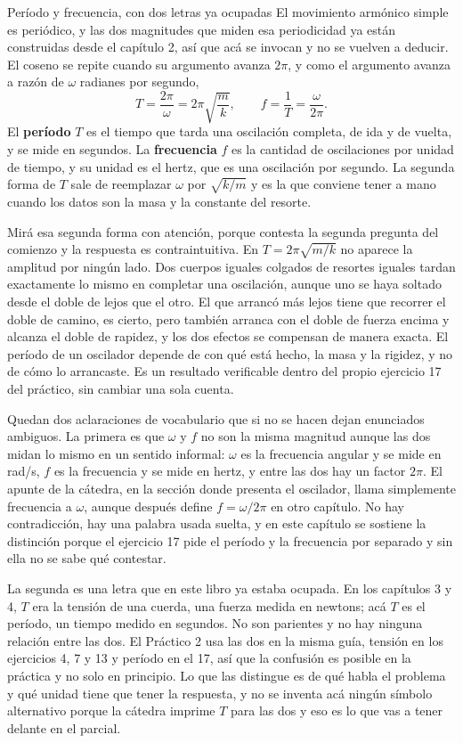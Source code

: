 \documentclass[11pt,openany]{book}
\begin{document}
\begin{bloque}{Período y frecuencia, con dos letras ya ocupadas}
El movimiento armónico simple es periódico, y las dos magnitudes que miden esa periodicidad ya están construidas desde el capítulo 2, así que acá se invocan y no se vuelven a deducir. El coseno se repite cuando su argumento avanza $2\pi$, y como el argumento avanza a razón de $\omega$ radianes por segundo,
\[
T = \frac{2\pi}{\omega} = 2\pi\sqrt{\frac{m}{k}},
\qquad
f = \frac{1}{T} = \frac{\omega}{2\pi} .
\]
El \textbf{período} $T$ es el tiempo que tarda una oscilación completa, de ida y de vuelta, y se mide en segundos. La \textbf{frecuencia} $f$ es la cantidad de oscilaciones por unidad de tiempo, y su unidad es el hertz, que es una oscilación por segundo. La segunda forma de $T$ sale de reemplazar $\omega$ por $\sqrt{k/m}$ y es la que conviene tener a mano cuando los datos son la masa y la constante del resorte.

Mirá esa segunda forma con atención, porque contesta la segunda pregunta del comienzo y la respuesta es contraintuitiva. En $T = 2\pi\sqrt{m/k}$ no aparece la amplitud por ningún lado. Dos cuerpos iguales colgados de resortes iguales tardan exactamente lo mismo en completar una oscilación, aunque uno se haya soltado desde el doble de lejos que el otro. El que arrancó más lejos tiene que recorrer el doble de camino, es cierto, pero también arranca con el doble de fuerza encima y alcanza el doble de rapidez, y los dos efectos se compensan de manera exacta. El período de un oscilador depende de con qué está hecho, la masa y la rigidez, y no de cómo lo arrancaste. Es un resultado verificable dentro del propio ejercicio 17 del práctico, sin cambiar una sola cuenta.

Quedan dos aclaraciones de vocabulario que si no se hacen dejan enunciados ambiguos. La primera es que $\omega$ y $f$ no son la misma magnitud aunque las dos midan lo mismo en un sentido informal: $\omega$ es la frecuencia angular y se mide en rad/s, $f$ es la frecuencia y se mide en hertz, y entre las dos hay un factor $2\pi$. El apunte de la cátedra, en la sección donde presenta el oscilador, llama simplemente frecuencia a $\omega$, aunque después define $f = \omega/2\pi$ en otro capítulo. No hay contradicción, hay una palabra usada suelta, y en este capítulo se sostiene la distinción porque el ejercicio 17 pide el período y la frecuencia por separado y sin ella no se sabe qué contestar.

La segunda es una letra que en este libro ya estaba ocupada. En los capítulos 3 y 4, $T$ era la tensión de una cuerda, una fuerza medida en newtons; acá $T$ es el período, un tiempo medido en segundos. No son parientes y no hay ninguna relación entre las dos. El Práctico 2 usa las dos en la misma guía, tensión en los ejercicios 4, 7 y 13 y período en el 17, así que la confusión es posible en la práctica y no solo en principio. Lo que las distingue es de qué habla el problema y qué unidad tiene que tener la respuesta, y no se inventa acá ningún símbolo alternativo porque la cátedra imprime $T$ para las dos y eso es lo que vas a tener delante en el parcial.


\end{bloque}
\end{document}
